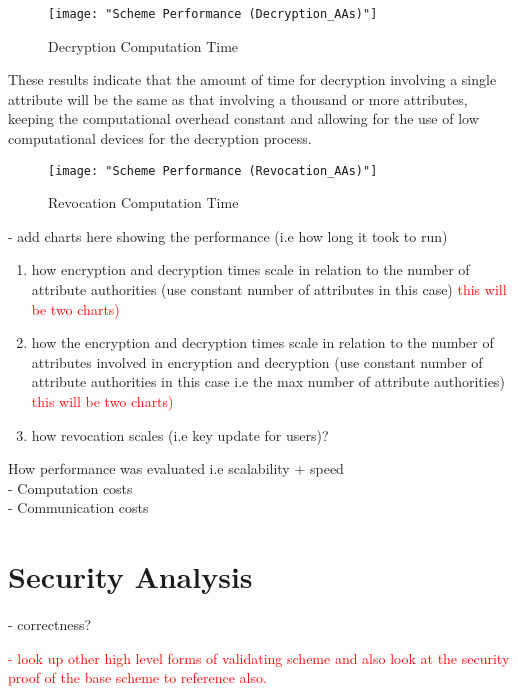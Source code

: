 \begin{figure}[]
	\centering
	\texttt{[image: "Scheme Performance (Decryption\_AAs)"]}
	\caption{Decryption Computation Time}
	\label{fig:res_dec_aas}
\end{figure}

These results indicate that the amount of time for decryption involving a single attribute will be the same as that involving a thousand or more attributes, keeping the computational overhead constant and allowing for the use of low computational devices for the decryption process.

\begin{figure}[]
	\centering
	\texttt{[image: "Scheme Performance (Revocation\_AAs)"]}
	\caption{Revocation Computation Time}
	\label{fig:res_rev_aas}
\end{figure}


- add charts here showing the performance (i.e how long it took to run)
\begin{enumerate}
	\item how encryption and decryption times scale in relation to the number of attribute authorities (use constant number of attributes in this case)  \textcolor{red}{this will be two charts)}
	\item how the encryption and decryption times scale in relation to the number of attributes involved in encryption and decryption (use constant number of attribute authorities in this case i.e the max number of attribute authorities)  \textcolor{red}{this will be two charts)}
	\item how revocation scales (i.e key update for users)?
\end{enumerate}

How performance was evaluated i.e scalability + speed
\\- Computation costs
\\- Communication costs

\section{Security Analysis}

- correctness? 

\textcolor{red}{- look up other high level forms of validating scheme and also look at the security proof of the base scheme to reference also.}